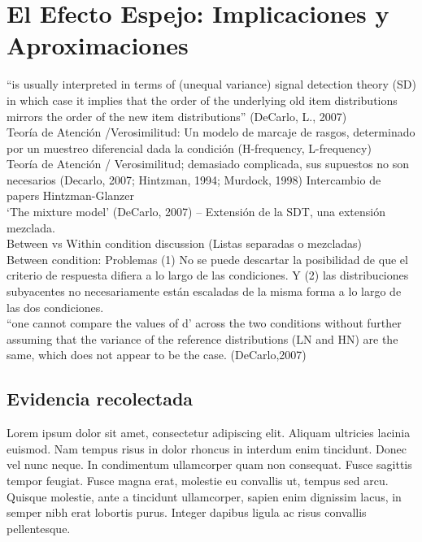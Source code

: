
\chapter{El Efecto Espejo: Implicaciones y Aproximaciones} %

\label{Cap_ME} %


“is usually interpreted in terms of (unequal variance) signal detection theory (SD) in which case it implies that the order of the underlying old item distributions mirrors the order of the new item distributions” (DeCarlo, L.,  2007)\\
Teoría de Atención /Verosimilitud: Un modelo de marcaje de rasgos, determinado por un muestreo diferencial dada la condición (H-frequency, L-frequency)\\
Teoría de Atención / Verosimilitud; demasiado complicada, sus supuestos no son necesarios (Decarlo, 2007; Hintzman, 1994; Murdock, 1998) Intercambio de papers Hintzman-Glanzer\\
‘The mixture model’ (DeCarlo, 2007) – Extensión de la SDT, una extensión mezclada.\\
Between vs Within condition discussion (Listas separadas o mezcladas)\\
Between condition: Problemas (1) No se puede descartar la posibilidad de que el criterio de respuesta difiera a lo largo de las condiciones. Y (2) las distribuciones subyacentes no necesariamente están escaladas de la misma forma a lo largo de las dos condiciones.\\
“one cannot compare the values of d’ across the two conditions without further assuming that the variance of the reference distributions (LN and HN) are the same, which does not appear to be the case. (DeCarlo,2007)  


\section{Evidencia recolectada}

Lorem ipsum dolor sit amet, consectetur adipiscing elit. Aliquam ultricies lacinia euismod. Nam tempus risus in dolor rhoncus in interdum enim tincidunt. Donec vel nunc neque. In condimentum ullamcorper quam non consequat. Fusce sagittis tempor feugiat. Fusce magna erat, molestie eu convallis ut, tempus sed arcu. Quisque molestie, ante a tincidunt ullamcorper, sapien enim dignissim lacus, in semper nibh erat lobortis purus. Integer dapibus ligula ac risus convallis pellentesque.



